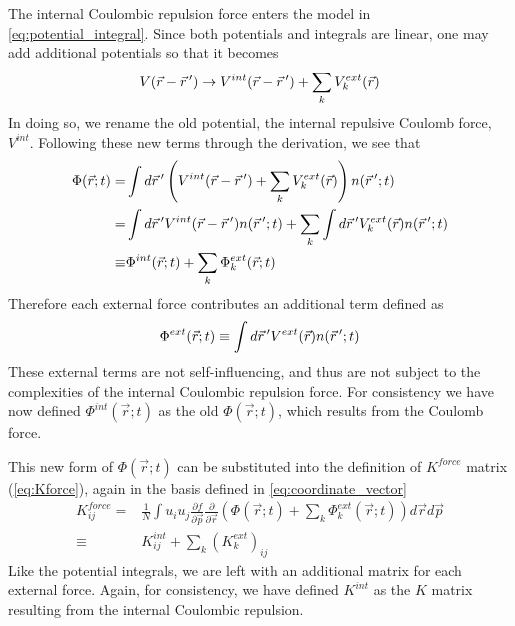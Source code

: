 The internal Coulombic repulsion force enters the model in \ref{eq:potential_integral}.
Since both potentials and integrals are linear, one may add additional potentials so that it becomes
\begin{equation}
  V(\vec{r} - \vec{r}\,^{\prime}) \rightarrow V^{int}(\vec{r} - \vec{r}\,^{\prime}) + \sum_{k} V_{k}^{ext}(\vec{r})
\end{equation}
In doing so, we rename the old potential, the internal repulsive Coulomb force, $V^{int}$.
Following these new terms through the derivation, we see that
\begin{equation}
  \begin{split}
    \Phi(\vec{r};t) = & \int d\vec{r}\,^{\prime} \left( V^{int}(\vec{r} - \vec{r}\,^{\prime}) + \sum_{k} V_{k}^{ext}(\vec{r}) \right) n(\vec{r}\,^{\prime}; t) \\
    = & \int d\vec{r}\,^{\prime} V^{int}(\vec{r} - \vec{r}\,^{\prime}) n(\vec{r}\,^{\prime}; t) + \sum_{k} \int d\vec{r}\,^{\prime} V_{k}^{ext}(\vec{r}) n(\vec{r}\,^{\prime}; t) \\
    \equiv & \Phi^{int}(\vec{r};t) + \sum_{k} \Phi_{k}^{ext}(\vec{r};t)
  \end{split}
\end{equation}
Therefore each external force contributes an additional term defined as
\begin{equation}
  \Phi^{ext}(\vec{r};t) \equiv \int d\vec{r}\,^{\prime} V^{ext}(\vec{r}) n(\vec{r}\,^{\prime}; t)
\end{equation}
These external terms are not self-influencing, and thus are not subject to the complexities of the internal Coulombic repulsion force.
For consistency we have now defined $\Phi^{int}(\vec{r};t)$ as the old $\Phi(\vec{r};t)$, which results from the Coulomb force. 

This new form of $\Phi(\vec{r};t)$ can be substituted into the definition of $K^{force}$ matrix (\ref{eq:Kforce}), again in the basis defined in \ref{eq:coordinate_vector} 
\begin{equation}
  \begin{split}
    K^{force}_{ij} = & \frac{1}{N} \int u_i u_j \frac{\partial f}{\partial \vec{p}} \frac{\partial}{\partial \vec{r}} \left( \Phi(\vec{r};t) + \sum_{k} \Phi_{k}^{ext}(\vec{r};t) \right) d\vec{r} d\vec{p} \\
    \equiv & K^{int}_{ij} + \sum_{k} (K_{k}^{ext})_{ij}
  \end{split}
\end{equation}
Like the potential integrals, we are left with an additional matrix for each external force. Again, for consistency, we have defined $K^{int}$ as the $K$ matrix resulting from the internal Coulombic repulsion.


